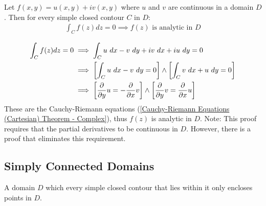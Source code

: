 \documentclass[12pt, english]{book}
\makeatletter
\renewenvironment{proof}[1][\proofname]{\par
	\pushQED{\qed}%
	\normalfont \topsep6\p@\@plus6\p@\relax
	\list{}{%
		\settowidth{\leftmargin}{\itshape\proofname:\hskip\labelsep}%
		\setlength{\labelwidth}{0pt}%
		\setlength{\itemindent}{-\leftmargin}%
	}%
	\item[\hskip\labelsep\itshape#1\@addpunct{:}]\ignorespaces
	}{ \popQED\endlist\@endpefalse}
\makeatother
\begin{document}
	\begin{theorem}
		\label{Morera's Theorem - Complex}
		Let \(f(x,y) = u(x,y) + iv(x,y)\) where \(u\) and \(v\) are continuous in a domain \(D\). Then for every simple closed contour \(C\) in \(D\):
		\begin{align*}
			\int_{C} f(z) dz = 0 \implies f(z) \text{ is analytic in } D
		\end{align*}
	\end{theorem}
	\begin{proof}
		{\color{Grey}
		\begin{align*}
			\int_{C} f(z) dz = 0 
			&\implies \int_{C} u \ dx - v \ dy + iv \ dx + iu \ dy = 0 \\
			&\implies \left[\int_{C} u \ dx - v \ dy = 0 \right] \land 
						\left[ \int_{C} v \ dx + u \ dy = 0 \right] \\
			&\implies \left[ \pdv{y}u = - \pdv{x} v \right] \land \left[ \pdv{y}v = \pdv{x} u \right]
		\end{align*}
		These are the Cauchy-Riemann equations (\cref{Cauchy-Riemann Equations (Cartesian) Theorem - Complex}), thus \(f(z)\) is analytic in \(D\).
		}
	\end{proof}
	Note: This proof requires that the partial derivatives to be continuous in \(D\). However, there is a proof that eliminates this requirement.

	\subsection{Simply Connected Domains} \label{Simply Connected Domains Subsection - Complex}
	
	\begin{definition}
		\label{Simply Connected (Domain) Definition - Complex}
		A domain \(D\) which every simple closed contour that lies within it only encloses points in \(D\).
	\end{definition}
\end{document}
